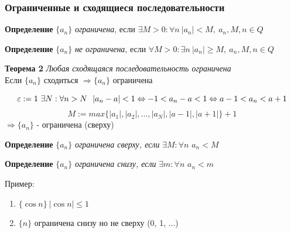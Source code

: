 \subsubsection*{Ограниченные и сходящиеся последовательности}

\begin{tcolorbox}
\textbf{Определение}
$\{a_n\}$  \textit{ограничена}, если $\exists M>0: \forall n\ |a_n|<M,\ a_n, M, n \in Q$
\end{tcolorbox}

\begin{tcolorbox}
\textbf{Определение}
$\{a_n\}$  \textit{не ограничена}, если $\forall M>0: \exists n\ |a_n|\geq M,\ a_n, M, n \in Q$ 
\end{tcolorbox}

\begin{tcolorbox}
\textbf{Теорема 2} \textit{Любая сходящаяся последовательность ограничена} \\
Если $\{a_n\}$ сходиться $\Rightarrow \{a_n\}$ ограничена
\end{tcolorbox}

\begin{tcolorbox}[title=Доказательство Т2, breakable]
\[\eps := 1\ \exists N: \forall n > N\ \ |a_n-a| < 1 \Leftrightarrow -1<a_n-a<1 \Leftrightarrow a-1 < a_n < a+1  \]
\[ M:= max\{ |a_1|, |a_2|, ..., |a_N|, |a-1|, |a+1| \} + 1\]
$\Rightarrow \{a_n\}$ - ограничена (сверху)
\end{tcolorbox}

\begin{tcolorbox}
\textbf{Определение}
$\{a_n\}$  \textit{ограничена сверху, если} $\exists M: \forall n$ $a_n < M$
\end{tcolorbox}

\begin{tcolorbox}
\textbf{Определение}
$\{a_n\}$  \textit{ограничена снизу, если} $\exists m: \forall n$ $a_n < m$
\end{tcolorbox}

Пример:
\begin{enumerate}
    \item $\{\cos n\}\ |\cos n| \leq 1$
    \item $\{n\}$ ограничена снизу но не сверху (0, 1, ...)
\end{enumerate}

